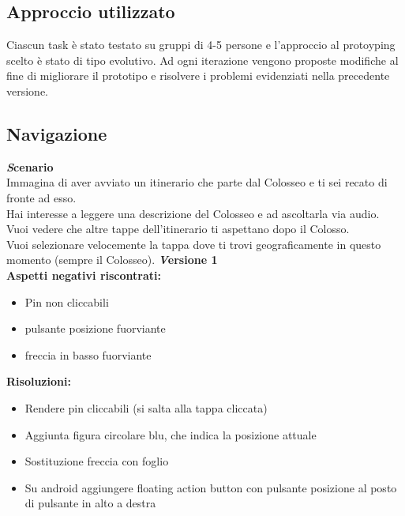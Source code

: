 \subsection{Approccio utilizzato}

Ciascun task è stato testato su gruppi di 4-5 persone e l'approccio al protoyping scelto è stato di tipo evolutivo. Ad ogni iterazione vengono proposte modifiche al fine di migliorare il prototipo e risolvere i problemi evidenziati nella precedente versione.

\clearpage


\subsection{Navigazione}
\textbf{\emph Scenario}\\
Immagina di aver avviato un itinerario che parte dal Colosseo e ti sei recato di fronte
ad esso.\\
Hai interesse a leggere una descrizione del Colosseo e ad ascoltarla via audio.\\
Vuoi vedere che altre tappe dell’itinerario ti aspettano dopo il Colosso.\\
Vuoi selezionare velocemente la tappa dove ti trovi geograficamente in questo momento (sempre il Colosseo).
\newline
\textbf{\emph Versione 1}\\
\textbf{Aspetti negativi riscontrati:}
\begin{itemize}[label=-]

\item Pin non cliccabili
\item pulsante posizione fuorviante
\item freccia in basso fuorviante

\end{itemize}

\textbf{Risoluzioni:}
\begin{itemize}[label=-]

\item Rendere pin cliccabili (si salta alla tappa cliccata)
\item Aggiunta figura circolare blu, che indica la posizione attuale
\item Sostituzione freccia con foglio
\item Su android aggiungere floating action button con pulsante posizione al posto di pulsante in alto a destra

\end{itemize}


